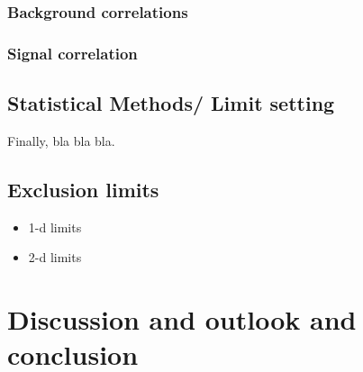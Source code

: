 \subsection*{Background correlations}
\subsection*{Signal correlation}
\section{Statistical Methods/ Limit setting}

Finally, bla bla bla.
\section{Exclusion limits}
\begin{itemize}
\item 1-d limits
\item 2-d limits
\end{itemize}


\chapter{Discussion and outlook and conclusion}
\label{sec:Discussion}
